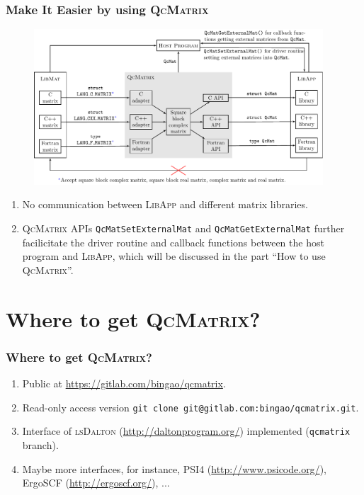 \documentclass[10pt]{beamer}
\begin{document}
{{\begin{frame}[fragile]
  \frametitle<presentation>{Make It Easier by using \textsc{QcMatrix}}
  \begin{figure}[htbp]
    \centering
    \includegraphics[width=10.8cm]{QcMatrix_application.pdf}
    \label{fig-QcMatrix-application}
  \end{figure}
  \vspace*{-2.6ex}
  \small
  \begin{enumerate}
    \item No communication between \textsc{LibApp} and different matrix libraries.
    \item \textsc{QcMatrix} APIs \verb|QcMatSetExternalMat| and \verb|QcMatGetExternalMat|
      further facilicitate the driver routine and callback functions between the host
      program and \textsc{LibApp}, which will be discussed in the part ``How to use
      \textsc{QcMatrix}''.
  \end{enumerate}
\end{frame}

\section{Where to get \textsc{QcMatrix}?}

\begin{frame}[fragile]
  \frametitle<presentation>{Where to get \textsc{QcMatrix}?}
  \begin{enumerate}
    \item Public at \url{https://gitlab.com/bingao/qcmatrix}.
    \item Read-only access version \verb|git clone git@gitlab.com:bingao/qcmatrix.git|.
    \item Interface of \textsc{lsDalton} (\url{http://daltonprogram.org/})
      implemented (\verb|qcmatrix| branch).
    \item Maybe more interfaces, for instance, PSI4 (\url{http://www.psicode.org/}),
      ErgoSCF (\url{http://ergoscf.org/}), ...
  \end{enumerate}
\end{frame}

}}
\end{document}
